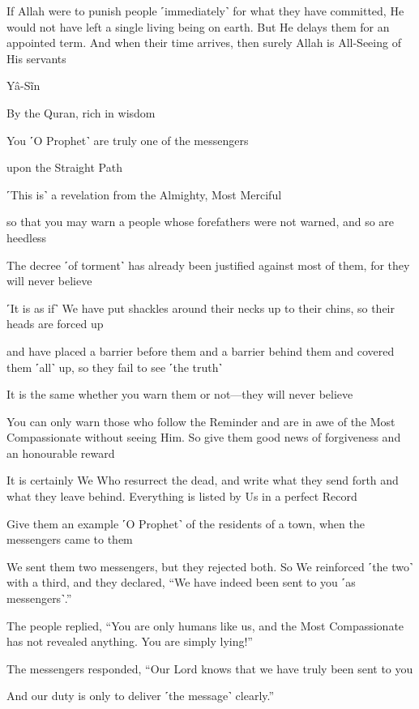 If Allah were to punish people ˹immediately˺ for what they have committed, He would not have left a single living being on earth. But He delays them for an appointed term. And when their time arrives, then surely Allah is All-Seeing of His servants

Yâ-Sĩn

By the Quran, rich in wisdom

You ˹O Prophet˺ are truly one of the messengers

upon the Straight Path

˹This is˺ a revelation from the Almighty, Most Merciful

so that you may warn a people whose forefathers were not warned, and so are heedless

The decree ˹of torment˺ has already been justified against most of them, for they will never believe

˹It is as if˺ We have put shackles around their necks up to their chins, so their heads are forced up

and have placed a barrier before them and a barrier behind them and covered them ˹all˺ up, so they fail to see ˹the truth˺

It is the same whether you warn them or not—they will never believe

You can only warn those who follow the Reminder and are in awe of the Most Compassionate without seeing Him. So give them good news of forgiveness and an honourable reward

It is certainly We Who resurrect the dead, and write what they send forth and what they leave behind. Everything is listed by Us in a perfect Record

Give them an example ˹O Prophet˺ of the residents of a town, when the messengers came to them

We sent them two messengers, but they rejected both. So We reinforced ˹the two˺ with a third, and they declared, “We have indeed been sent to you ˹as messengers˺.”

The people replied, “You are only humans like us, and the Most Compassionate has not revealed anything. You are simply lying!”

The messengers responded, “Our Lord knows that we have truly been sent to you

And our duty is only to deliver ˹the message˺ clearly.”

